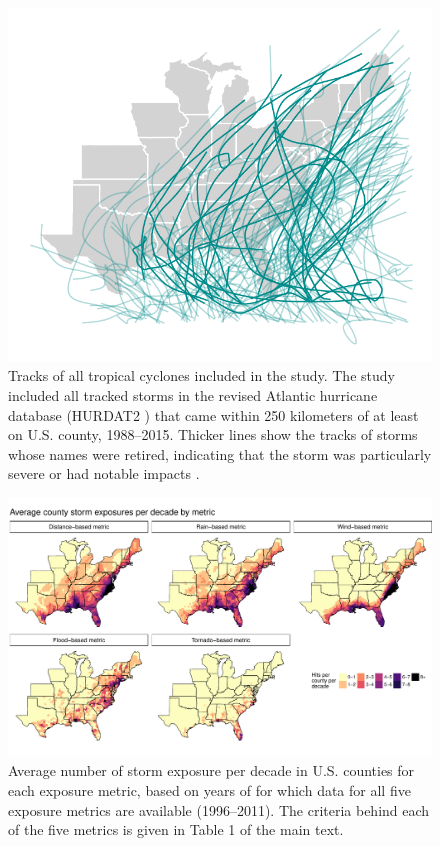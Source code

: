 \documentclass[fleqn,10pt,lineno]{olplainarticle}
\begin{document}
\newpage

\begin{figure}[tbhp!]
\centering
\includegraphics[width=0.7\linewidth]{figures/hurrtracks}
\caption{Tracks of all tropical cyclones included in the study. The study included all tracked storms in the revised Atlantic hurricane database (HURDAT2 \cite{landsea2013}) that came within 250 kilometers of at least on U.S. county, 1988--2015. Thicker lines show the tracks of storms whose names were retired, indicating that the storm was particularly severe or had notable impacts \cite{retirednames}.}
\label{fig:hurrtracks}
\end{figure}

\clearpage

\begin{figure}[tbhp!]
\centering
\includegraphics[width=\linewidth]{figures/averageexposureonlysupp}
\caption{Average number of storm exposure per decade in U.S. counties for each exposure metric, based on years of for which data for all five exposure metrics are available (1996--2011). The criteria behind each of the five metrics is given in Table 1 of the main text.}
\label{fig:averageexposuresupp}
\end{figure}
\end{document}
